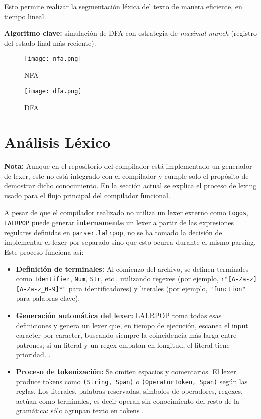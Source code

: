 \documentclass{article}
\begin{document}
Esto permite realizar la segmentación léxica del texto de manera eficiente, en tiempo lineal.

\textbf{Algoritmo clave:} simulación de DFA con estrategia de \textit{maximal munch} (registro del estado final más reciente).

\begin{figure}[H]
    \centering
    \texttt{[image: nfa.png]}
    \caption{NFA}
    \label{fig:nfa}
\end{figure}

\begin{figure}[H]
    \centering
    \texttt{[image: dfa.png]}
    \caption{DFA}
    \label{fig:dfa}
\end{figure}


\section{Análisis Léxico}
\textbf{Nota:} Aunque en el repositorio del compilador está implementado un generador de lexer, este no está integrado con el compilador y cumple solo el propósito de demostrar dicho conocimiento.
En la sección actual se explica el proceso de lexing usado para el flujo principal del compilador funcional.

\vspace{1.0cm}

A pesar de que el compilador realizado no utiliza un lexer externo como \texttt{Logos}, \texttt{LALRPOP} puede generar \textbf{internamente} un lexer a partir de las expresiones regulares definidas en \texttt{parser.lalrpop}, no se ha tomado la decisión de implementar el lexer por separado sino que esto ocurra durante el mismo parsing. Este proceso funciona así:

\begin{itemize}
    \item \textbf{Definición de terminales:}
    Al comienzo del archivo, se definen terminales como \texttt{Identifier}, \texttt{Num}, \texttt{Str}, etc., utilizando regexes (por ejemplo, \texttt{r"[A-Za-z][A-Za-z\_0-9]*"} para identificadores) y literales (por ejemplo, \texttt{"function"} para palabras clave).

    \item \textbf{Generación automática del lexer:}
    LALRPOP toma todas esas definiciones y genera un lexer que, en tiempo de ejecución, escanea el input caracter por caracter, buscando siempre la coincidencia más larga entre patrones; si un literal y un regex empatan en longitud, el literal tiene prioridad.
    .
    \item \textbf{Proceso de tokenización:}
    Se omiten espacios y comentarios. El lexer produce tokens como \texttt{(String, Span)} o \texttt{(OperatorToken, Span)} según las reglas. Los literales, palabras reservadas, símbolos de operadores, regexes, actúan como terminales, es decir operan sin conocimiento del resto de la gramática: sólo agrupan texto en tokens .
\end{itemize}
\end{document}

